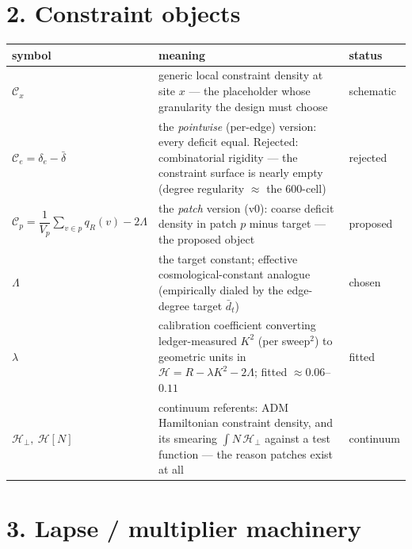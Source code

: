 \documentclass[11pt]{article}
\newcommand{\C}{\mathcal{C}}
\newcommand{\Hh}{\mathcal{H}}
\begin{document}
\section*{2. Constraint objects}

\begin{tabularx}{\textwidth}{@{}l L l@{}}
\toprule
symbol & meaning & status \\
\midrule
$\C_x$ & generic local constraint density at site $x$ --- the placeholder whose granularity the design must choose & schematic \\
$\C_e = \delta_e - \bar\delta$ & the \emph{pointwise} (per-edge) version: every deficit equal. Rejected: combinatorial rigidity --- the constraint surface is nearly empty (degree regularity $\approx$ the 600-cell) & rejected \\
$\C_p = \dfrac{1}{V_p}\displaystyle\sum_{v\in p} q_R(v) - 2\Lambda$ & the \emph{patch} version (v0): coarse deficit density in patch $p$ minus target --- the proposed object & proposed \\
$\Lambda$ & the target constant; effective cosmological-constant analogue (empirically dialed by the edge-degree target $\bar d_t$) & chosen \\
$\lambda$ & calibration coefficient converting ledger-measured $K^2$ (per sweep$^2$) to geometric units in $\Hh = R - \lambda K^2 - 2\Lambda$; fitted $\approx 0.06$--$0.11$ & fitted \\
$\Hh_\perp,\ \Hh[N]$ & continuum referents: ADM Hamiltonian constraint density, and its smearing $\int N\,\Hh_\perp$ against a test function --- the reason patches exist at all & continuum \\
\bottomrule
\end{tabularx}

\section*{3. Lapse / multiplier machinery}
\end{document}
